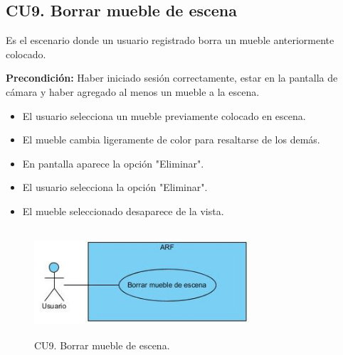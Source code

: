 \subsection{CU9. Borrar mueble de escena}\par
Es el escenario donde un usuario registrado borra un mueble anteriormente colocado.\par
\textbf{Precondición:} Haber iniciado sesión correctamente, estar en la pantalla de cámara y haber agregado al menos un mueble a la escena.\par
\begin{itemize}
	\item El usuario selecciona un mueble previamente colocado en escena.
	\item El mueble cambia ligeramente de color para resaltarse de los demás.
	\item En pantalla aparece la opción "Eliminar".
	\item El usuario selecciona la opción "Eliminar".
	\item El mueble seleccionado desaparece de la vista.
\end{itemize}

\begin{figure}[h!]
	\centering
	\includegraphics[width=8cm,height=4cm]{imagenes/analisis/cu/borrar_mueble.jpg}
	\caption{CU9. Borrar mueble de escena.}
	\label{fig:borrarmueble}
\end{figure} 


